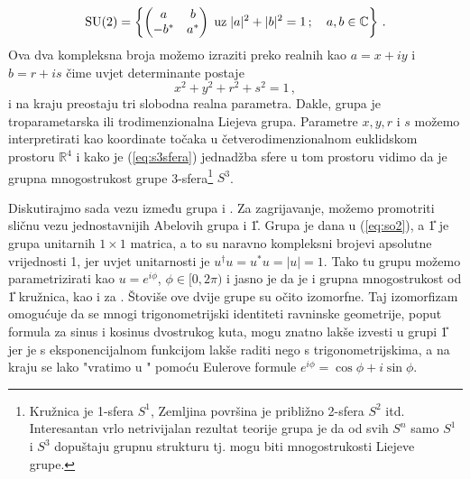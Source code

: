 \begin{equation}
    \mathrm{SU}(2) = \left\{
        \begin{pmatrix}
            a & b \\ -b^* & a^*
    \end{pmatrix} \; \text{uz}\;   |a|^2 + |b|^2 = 1\,;\quad  a,b \in\mathbb{C} \right\} \,.
    \label{eq:su2ab}
\end{equation}
Ova dva kompleksna broja možemo izraziti preko realnih kao $a = x + iy$ i
$b = r + is$ čime uvjet determinante postaje
\begin{equation}
    x^2 + y^2 +r^2 +s^2 = 1 \,,
    \label{eq:s3sfera}
\end{equation}
i na kraju preostaju tri slobodna realna parametra. Dakle, grupa  je troparametarska
ili trodimenzionalna Liejeva grupa. Parametre $x, y, r$ i $s$ možemo interpretirati
kao koordinate točaka u četverodimenzionalnom euklidskom prostoru $\mathbb{R}^4$
i kako je (\ref{eq:s3sfera}) jednadžba sfere u tom prostoru vidimo da je
grupna mnogostrukost grupe  3-sfera\footnote{Kružnica je 1-sfera $S^1$,
    Zemljina površina je približno 2-sfera $S^2$ itd. Interesantan vrlo
    netrivijalan rezultat teorije grupa je da od svih $S^n$ samo $S^1$ i $S^3$ dopuštaju
grupnu strukturu tj. mogu biti mnogostrukosti Liejeve grupe.} $S^3$.


Diskutirajmo sada vezu između grupa  i . Za zagrijavanje, možemo
promotriti sličnu vezu jednostavnijih Abelovih grupa  i \U{1}. Grupa  je dana
u (\ref{eq:so2}), a \U{1} je grupa unitarnih $1 \times 1$
matrica, a to su naravno kompleksni brojevi apsolutne vrijednosti 1, jer uvjet
unitarnosti je $u^\dagger u = u^* u = |u| = 1$. Tako tu grupu možemo
parametrizirati kao $u = e^{i\phi}$, $\phi\in [0, 2\pi)$ i jasno je da je
i grupna mnogostrukost od \U{1} kružnica, kao i za . Štoviše ove dvije
grupe su očito izomorfne. Taj izomorfizam omogućuje da se mnogi
trigonometrijski identiteti ravninske geometrije, poput formula za sinus i kosinus dvostrukog kuta,
mogu znatno lakše izvesti u grupi \U{1} jer je s eksponencijalnom
funkcijom lakše raditi nego s trigonometrijskima, a na kraju se lako "vratimo
u " pomoću Eulerove formule $e^{i\phi} = \cos\phi + i\sin\phi$.

